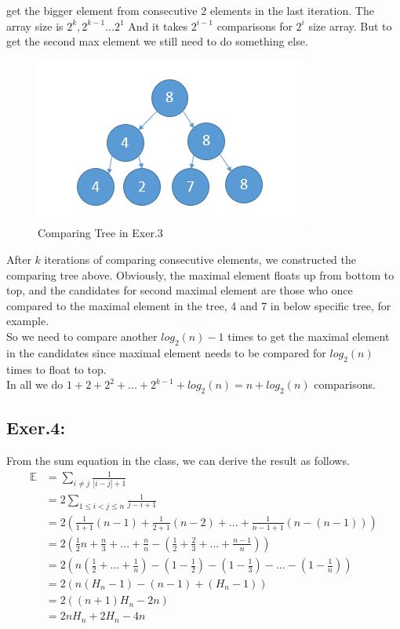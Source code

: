 \documentclass[UTF8]{ctexart}
\begin{document}
    get the bigger element from consecutive 2 elements in the last iteration. The array size is $2^k, 2^{k - 1}...2^{1}$
    And it takes $2^{i - 1}$ comparisons for $2^i$ size array. But to get the second max element we still need to do something else.
    \begin{figure}[h]
        \centering
        \includegraphics[]{2-wayTree.png}
        \caption{Comparing Tree in Exer.3}
    \end{figure}
    \hspace*{1em}After $k$ iterations of comparing consecutive elements, we constructed the comparing tree above.
    Obviously, the maximal element floats up from bottom to top, and the candidates for second maximal element
    are those who once compared to the maximal element in the tree, 4 and 7 in below specific tree, for example.\\
    \hspace*{1em}So we need to compare another $log_2(n) - 1$ times to get the maximal element in the candidates since maximal element 
    needs to be compared for $log_2(n)$ times to float to top.\\
    \hspace*{1em}In all we do $1 + 2 + 2^2 +... + 2^{k - 1} + log_2(n) = n + log_2(n)$ comparisons.\\

\subsection*{Exer.4:}
    From the sum equation in the class, we can derive the result as follows.
\begin{align*}
    \mathbb{E}  & = \sum_{i \neq j} \frac{1}{|i - j| + 1}\\
                & = 2\sum_{1 \leq i < j \leq n} \frac{1}{j - i + 1}\\
                & = 2(\frac{1}{1 + 1}(n - 1) + \frac{1}{2 + 1}(n - 2) + ... + \frac{1}{n - 1 + 1}(n - (n - 1)))\\
                & = 2(\frac{1}{2}n + \frac{n}{3} + ... + \frac{n}{n} - (\frac{1}{2} + \frac{2}{3} + ... + \frac{n - 1}{n}))\\
                & = 2(n(\frac{1}{2} + ... + \frac{1}{n}) - (1 - \frac{1}{2}) - (1 - \frac{1}{3}) -... - (1 - \frac{1}{n}))\\
                & = 2(n(H_n - 1) - (n - 1) + (H_n -1))\\
                & = 2((n + 1)H_n - 2n)\\
                & = 2nH_n + 2H_n - 4n
\end{align*}
\end{document}
